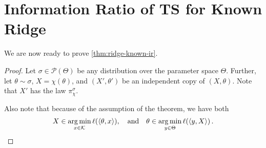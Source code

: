 \documentclass[letter, 12pt]{report}
\newcommand{\argmin}{\operatornamewithlimits{arg\,min}}
\newcommand{\cK}{\mathcal K}
\newcommand{\sP}{\mathscr P}
\newcommand{\1}{\mathbf{1}}
\newcommand{\ts}{\textsc{TS}\xspace}
\theoremstyle{plain}
\theoremstyle{definition}
\theoremstyle{remark}
\begin{document}
\section{Information Ratio of \ts for Known Ridge}
We are now ready to prove \cref{thm:ridge-known-ir}.
\KnownRidgeLemma*
\begin{proof}
    Let $\sigma \in \sP(\Theta)$ be any distribution over the parameter space $\Theta$.
    Further, let $\theta \sim \sigma$, $X = \chi(\theta)$,
    and $(X', \theta')$ be an independent copy of $(X, \theta)$.
    Note that $X'$ has the law $\pi_\chi^\sigma$.

    Also note that because of the assumption of the theorem, we have both
    \begin{align}
        X \in \argmin_{x \in \cK} \ell(\langle \theta, x \rangle),\quad \text{and} \quad
        \theta \in \argmin_{y \in \Theta} \ell(\langle y, X \rangle)\,.
        \label{eq:double-greedy}
    \end{align}


\end{proof}
\end{document}

